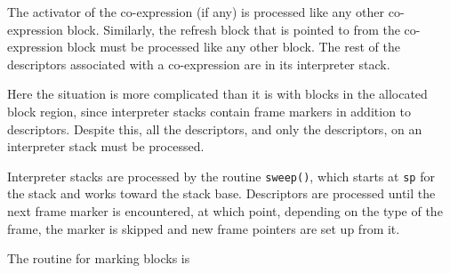 The activator of the co-expression (if any) is processed like any
other co-expression block. Similarly, the refresh block that is
pointed to from the co-expression block must be processed like any
other block. The rest of the descriptors associated with a
co-expression are in its interpreter stack.

Here the situation is more complicated than it is with blocks in the
allocated block region, since interpreter stacks contain frame markers
in addition to descriptors. Despite this, all the descriptors, and
only the descriptors, on an interpreter stack must be processed.

Interpreter stacks are processed by the routine \texttt{sweep()},
which starts at \texttt{sp} for the stack and works toward the stack
base. Descriptors are processed until the next frame marker is
encountered, at which point, depending on the type of the frame, the
marker is skipped and new frame pointers are set up from it.

The routine for marking blocks is

